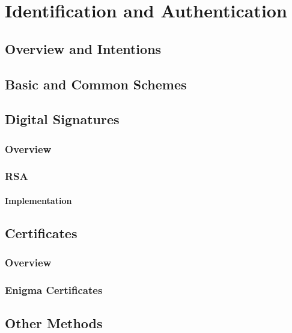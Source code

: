 
\chapter{Identification and Authentication} 
\label{Chapter5}

\section{Overview and Intentions}

\section{Basic and Common Schemes}

\section{Digital Signatures}

  \subsection{Overview}
  \subsection{RSA}
  \subsubsection{Implementation}

\section{Certificates}

  \subsection{Overview}
  \subsection{Enigma Certificates}

\section{Other Methods}

